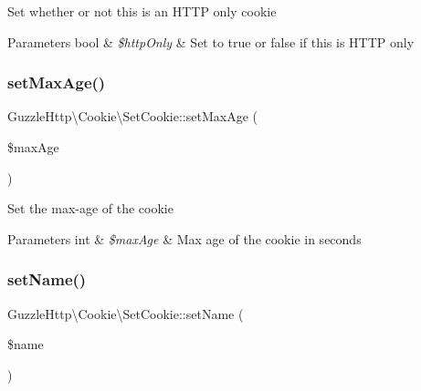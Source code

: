 Set whether or not this is an H\+T\+TP only cookie


\begin{DoxyParams}[1]{Parameters}
bool & {\em \$http\+Only} & Set to true or false if this is H\+T\+TP only \\
\hline
\end{DoxyParams}
\mbox{\label{classGuzzleHttp_1_1Cookie_1_1SetCookie_aeb2f0adfeb501acea1c705b5fb7b9815}} 
\subsubsection{\texorpdfstring{set\+Max\+Age()}{setMaxAge()}}
{\footnotesize\ttfamily Guzzle\+Http\textbackslash{}\+Cookie\textbackslash{}\+Set\+Cookie\+::set\+Max\+Age (\begin{DoxyParamCaption}\item[{}]{\$max\+Age }\end{DoxyParamCaption})}

Set the max-\/age of the cookie


\begin{DoxyParams}[1]{Parameters}
int & {\em \$max\+Age} & Max age of the cookie in seconds \\
\hline
\end{DoxyParams}
\mbox{\label{classGuzzleHttp_1_1Cookie_1_1SetCookie_a8921080d5e7ec99f8a6aaad461543f47}} 
\subsubsection{\texorpdfstring{set\+Name()}{setName()}}
{\footnotesize\ttfamily Guzzle\+Http\textbackslash{}\+Cookie\textbackslash{}\+Set\+Cookie\+::set\+Name (\begin{DoxyParamCaption}\item[{}]{\$name }\end{DoxyParamCaption})}


